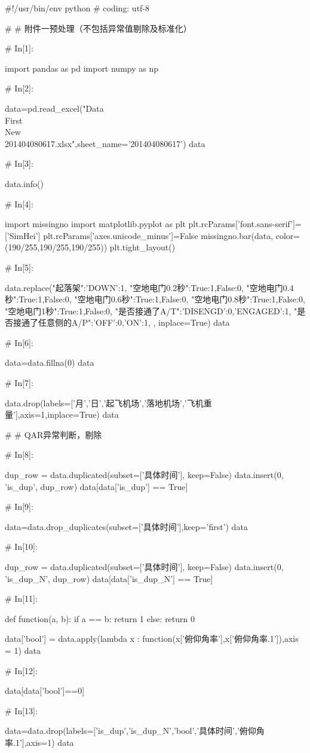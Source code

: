\documentclass{MathorCupModeling}
\begin{document}
\begin{python}
#!/usr/bin/env python
# coding: utf-8

# # 附件一预处理（不包括异常值剔除及标准化）

# In[1]:


import pandas as pd
import numpy as np


# In[2]:


data=pd.read_excel("Data\\First\\New\\201404080617.xlsx",sheet_name='201404080617')
data


# In[3]:


data.info()


# In[4]:


import missingno
import matplotlib.pyplot as plt
plt.rcParams['font.sans-serif']=['SimHei']
plt.rcParams['axes.unicode_minus']=False
missingno.bar(data, color=(190/255,190/255,190/255))
plt.tight_layout()


# In[5]:


data.replace({"起落架":{'DOWN':1},
              "空地电门0.2秒":{True:1,False:0},
              "空地电门0.4秒":{True:1,False:0},
              "空地电门0.6秒":{True:1,False:0},
              "空地电门0.8秒":{True:1,False:0},
              "空地电门1秒":{True:1,False:0},
              "是否接通了A/T":{'DISENGD':0,'ENGAGED':1},
              "是否接通了任意侧的A/P":{'OFF':0,'ON':1},
              }, inplace=True)
data


# In[6]:


data=data.fillna(0)
data


# In[7]:


data.drop(labels=['月','日','起飞机场','落地机场','飞机重量'],axis=1,inplace=True)
data


# # QAR异常判断，剔除

# In[8]:


dup_row = data.duplicated(subset=['具体时间'], keep=False)
data.insert(0, 'is_dup', dup_row)
data[data['is_dup'] == True]


# In[9]:


data=data.drop_duplicates(subset=['具体时间'],keep='first')
data


# In[10]:


dup_row = data.duplicated(subset=['具体时间'], keep=False)
data.insert(0, 'is_dup_N', dup_row)
data[data['is_dup_N'] == True]


# In[11]:


def function(a, b):
    if a == b:
        return 1
    else:
        return 0


data['bool'] = data.apply(lambda x : function(x['俯仰角率'],x['俯仰角率.1']),axis = 1)
data


# In[12]:


data[data['bool']==0]


# In[13]:


data=data.drop(labels=['is_dup','is_dup_N','bool','具体时间','俯仰角率.1'],axis=1)
data


\end{python}
\end{document}
